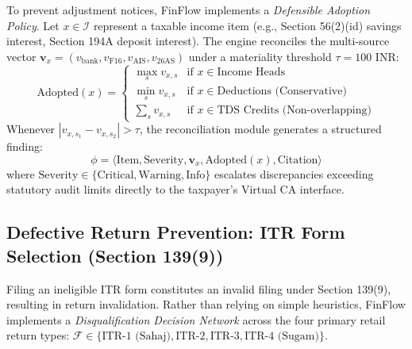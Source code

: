 \documentclass[conference]{IEEEtran}
\begin{document}
To prevent adjustment notices, FinFlow implements a \textit{Defensible Adoption Policy}. Let $x \in \mathcal{I}$ represent a taxable income item (e.g., Section 56(2)(id) savings interest, Section 194A deposit interest). The engine reconciles the multi-source vector $\mathbf{v}_x = (v_{\text{bank}}, v_{\text{F16}}, v_{\text{AIS}}, v_{26\text{AS}})$ under a materiality threshold $\tau = 100$ INR:
\begin{equation}
\label{eq:defensible_adoption}
\text{Adopted}(x) = \begin{cases}
\max_{s} v_{x, s} & \text{if } x \in \text{Income Heads} \\
\min_{s} v_{x, s} & \text{if } x \in \text{Deductions (Conservative)} \\
\sum_{s} v_{x, s} & \text{if } x \in \text{TDS Credits (Non-overlapping)}
\end{cases}
\end{equation}
Whenever $|v_{x, s_1} - v_{x, s_2}| > \tau$, the reconciliation module generates a structured finding:
\begin{equation}
\phi = \langle \text{Item}, \text{Severity}, \mathbf{v}_x, \text{Adopted}(x), \text{Citation} \rangle
\end{equation}
where $\text{Severity} \in \{\text{Critical}, \text{Warning}, \text{Info}\}$ escalates discrepancies exceeding statutory audit limits directly to the taxpayer's Virtual CA interface.

\subsection{Defective Return Prevention: ITR Form Selection (Section 139(9))}
Filing an ineligible ITR form constitutes an invalid filing under Section 139(9), resulting in return invalidation. Rather than relying on simple heuristics, FinFlow implements a \textit{Disqualification Decision Network} across the four primary retail return types: $\mathcal{F} \in \{\text{ITR-1 (Sahaj)}, \text{ITR-2}, \text{ITR-3}, \text{ITR-4 (Sugam)}\}$.
\end{document}
